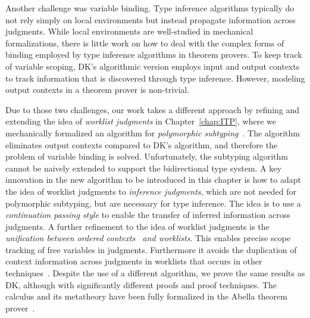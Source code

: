 Another challenge was variable binding. Type inference algorithms
typically do not rely simply on local environments but instead
propagate information across judgments. While local environments are
well-studied in mechanical formalizations, there is little work on how
to deal with the complex forms of binding employed by type inference algorithms
in theorem provers. To
keep track of variable scoping, DK's algorithmic version employs input
and output contexts to track information that is discovered through
type inference. However, modeling output contexts in a theorem prover
is non-trivial.

Due to those two challenges, our work takes a different approach by refining and
extending the idea of \emph{worklist judgments}
in Chapter~\ref{chap:ITP},
where we mechanically formalized an algorithm for
\emph{polymorphic subtyping}~\citep{odersky1996putting}.
The algorithm eliminates output contexts compared to DK's algorithm,
and therefore the problem of variable binding is solved.
Unfortunately, the subtyping algorithm cannot be naively extended
to support the bidirectional type system.
A key innovation in the new algorithm to be introduced in this chapter is how
to adapt the idea of worklist judgments to
\emph{inference judgments}, which are not needed for polymorphic
subtyping, but are necessary for type inference.
The idea is to use a \emph{continuation
passing style} to enable the transfer of inferred information across
judgments. A further refinement to the idea of worklist judgments is
the \emph{unification between ordered
  contexts~\citep{gundry2010type,dunfield2013complete} and worklists}.
This enables precise scope tracking of free variables in
judgments. Furthermore it avoids the duplication of context
information across judgments in worklists that occurs in other
techniques~\citep{Reed2009,Abel2011higher}.
Despite the use of a different algorithm, we prove the
same results as DK, although with significantly different proofs and
proof techniques. The calculus and its metatheory
have been fully formalized in the Abella theorem prover~\citep{AbellaDesc}.



%






